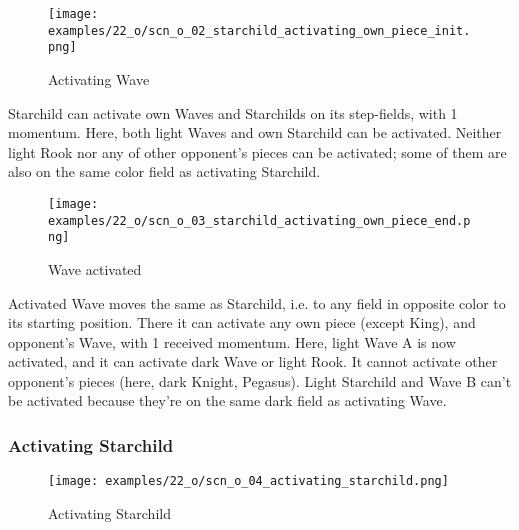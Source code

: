 \vspace*{-1.1\baselineskip}
\noindent
\begin{figure}[!h]
\texttt{[image: examples/22\_o/scn\_o\_02\_starchild\_activating\_own\_piece\_init.png]}
\caption{Activating Wave}
\label{fig:scn_o_02_starchild_activating_own_piece_init}
\end{figure}

Starchild can activate own Waves and Starchilds on its step-fields, with 1 momentum. Here,
both light Waves and own Starchild can be activated. Neither light Rook nor any of other
opponent's pieces can be activated; some of them are also on the same color field as
activating Starchild.

\clearpage %

\vspace*{-2.1\baselineskip}
\noindent
\begin{figure}[!h]
\texttt{[image: examples/22\_o/scn\_o\_03\_starchild\_activating\_own\_piece\_end.png]}
\caption{Wave activated}
\label{fig:scn_o_03_starchild_activating_own_piece_end}
\end{figure}

Activated Wave moves the same as Starchild, i.e. to any field in opposite color to its starting
position. There it can activate any own piece (except King), and opponent's Wave, with 1 received
momentum. Here, light Wave A is now activated, and it can activate dark Wave or light Rook. It
cannot activate other opponent's pieces (here, dark Knight, Pegasus). Light Starchild and Wave B
can't be activated because they're on the same dark field as activating Wave.

\clearpage %

\subsubsection*{Activating Starchild}

\vspace*{-1.3\baselineskip}
\noindent
\begin{figure}[!h]
\texttt{[image: examples/22\_o/scn\_o\_04\_activating\_starchild.png]}
\caption{Activating Starchild}
\label{fig:scn_o_04_activating_starchild}
\end{figure}

